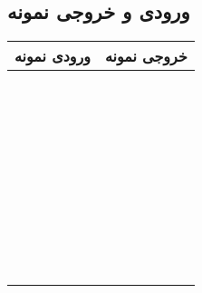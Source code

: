 \documentclass{utap}
\begin{document}
    \subsection{ورودی و خروجی نمونه}
    \begin{table}[H]
        \centering
        \begin{tabular}{|c|c|}
            \hline
            ورودی نمونه & خروجی نمونه\\
            \hline
            \hline
            \begin{latin}\begin{minipage}[]{0.3\textwidth}\footnotesize
            
            \end{minipage}\end{latin}
            &
            \begin{latin}\begin{minipage}[]{0.3\textwidth}\footnotesize
            
            \begin{verbatim}







            \end{verbatim}
            \end{minipage}\end{latin}
            \\
            \hline
            \begin{latin}\begin{minipage}[]{0.3\textwidth}\footnotesize
            
            \end{minipage}\end{latin}
            &
            \begin{latin}\begin{minipage}[]{0.3\textwidth}\footnotesize
            
            \begin{verbatim}





\end{verbatim}
\end{minipage}
\end{latin}
\end{tabular}
\end{table}
\end{document}
